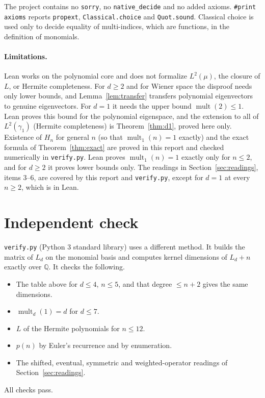 \documentclass[11pt]{article}
\theoremstyle{definition}
\theoremstyle{remark}
\newcommand{\Q}{\mathbb{Q}}
\newcommand{\mult}{\operatorname{mult}}
\begin{document}
The project contains no \texttt{sorry}, no \texttt{native\_decide} and no added axioms.
\texttt{\#print axioms} reports \texttt{propext}, \texttt{Classical.choice} and
\texttt{Quot.sound}. Classical choice is used only to decide equality of multi-indices,
which are functions, in the definition of monomials.

\paragraph{Limitations.} Lean works on the polynomial core and does not formalize
$L^2(\mu)$, the closure of $L$, or Hermite completeness. For $d\ge2$ and for Wiener
space the disproof needs only lower bounds, and Lemma~\ref{lem:transfer} transfers
polynomial eigenvectors to genuine eigenvectors. For $d=1$ it needs the upper bound
$\mult(2)\le1$. Lean proves this bound for the polynomial eigenspace, and the extension
to all of $L^2(\gamma_1)$ (Hermite completeness) is Theorem~\ref{thm:d1}, proved here
only. Existence of $H_n$ for general $n$ (so that $\mult_1(n)=1$ exactly) and the exact
formula of Theorem~\ref{thm:exact} are proved in this report and checked numerically
in \texttt{verify.py}. Lean proves $\mult_1(n)=1$ exactly only for $n\le2$, and for $d\ge2$ it proves lower bounds only. The
readings in Section~\ref{sec:readings}, items 3--6, are covered by this report and
\texttt{verify.py}, except for $d=1$ at every $n\ge2$, which is in Lean.

\section{Independent check}
\texttt{verify.py} (Python 3 standard library) uses a different method. It builds
the matrix of $L_d$ on the monomial basis and computes kernel dimensions of $L_d+n$
exactly over $\Q$. It checks the following.
\begin{itemize}
\item The table above for $d\le4$, $n\le5$, and that degree $\le n+2$ gives the same
dimensions.
\item $\mult_d(1)=d$ for $d\le7$.
\item $L$ of the Hermite polynomials for $n\le12$.
\item $p(n)$ by Euler's recurrence and by enumeration.
\item The shifted, eventual, symmetric and weighted-operator readings of
Section~\ref{sec:readings}.
\end{itemize}
All checks pass.
\end{document}
